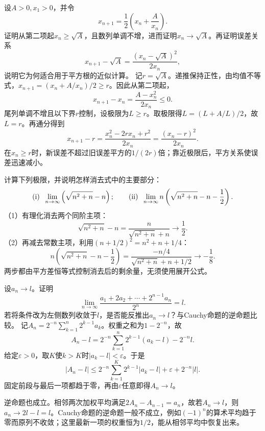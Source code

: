 设\(A>0,x_1>0\)，并令
\begin{equation*}
 x_{n+1}=\frac12\left(x_n+\frac A{x_n}\right).
\end{equation*}
证明从第二项起\(x_n\ge\sqrt A\)，且数列单调不增，进而证明\(x_n\to\sqrt A\)。再证明误差关系
\begin{equation*}
 x_{n+1}-\sqrt A=\frac{(x_n-\sqrt A)^2}{2x_n},
\end{equation*}
说明它为何适合用于平方根的近似计算。
\solutionanswer
记\(r=\sqrt A\)。递推保持正性，由均值不等式，\(x_{n+1}=(x_n+A/x_n)/2\ge r\)。因此从第二项起，
\[
x_{n+1}-x_n=\frac{A-x_n^2}{2x_n}\le0.
\]
尾列单调不增且以下界\(r\)控制，设极限为\(L\ge r\)。取极限得\(L=(L+A/L)/2\)，故\(L=r\)。再通分得到
\[
x_{n+1}-r=\frac{x_n^2-2rx_n+r^2}{2x_n}
=\frac{(x_n-r)^2}{2x_n}.
\]
在\(x_n\ge r\)时，新误差不超过旧误差平方的\(1/(2r)\)倍；靠近极限后，平方关系使误差迅速减小。


计算下列极限，并说明怎样消去式中的主要部分：
\begin{equation*}
 \exercisesubitem{1}\ \lim_{n\to\infty}\left(\sqrt{n^2+n}-n\right);
 \qquad
 \exercisesubitem{2}\ \lim_{n\to\infty}n\left(\sqrt{n^2+n}-n-\frac12\right).
\end{equation*}
\solutionanswer
（1）有理化消去两个同阶主项：
\[
\sqrt{n^2+n}-n=\frac n{\sqrt{n^2+n}+n}\to\frac12.
\]
（2）再减去常数主项，利用\((n+1/2)^2=n^2+n+1/4\)：
\[
n\left(\sqrt{n^2+n}-n-\frac12\right)
=\frac{-n/4}{\sqrt{n^2+n}+n+1/2}\to-\frac18.
\]
两步都由平方差恒等式控制消去后的剩余量，无须使用展开公式。


设\(a_n\to l\)。证明
\begin{equation*}
 \lim_{n\to\infty}\frac{a_1+2a_2+\cdots+2^{n-1}a_n}{2^n}=l.
\end{equation*}
若将条件改为左侧数列收敛于\(l\)，是否能反推出\(a_n\to l\)？与Cauchy命题的逆命题比较。
\solutionanswer
记\(A_n=2^{-n}\sum_{k=1}^n2^{k-1}a_k\)。权重之和为\(1-2^{-n}\)，故
\[
A_n-l=2^{-n}\sum_{k=1}^n2^{k-1}(a_k-l)-2^{-n}l.
\]
给定\(\varepsilon>0\)，取\(K\)使\(k>K\)时\(|a_k-l|<\varepsilon\)。于是
\[
|A_n-l|\le2^{-n}\sum_{k=1}^K2^{k-1}|a_k-l|+\varepsilon+2^{-n}|l|.
\]
固定前段与最后一项都趋于零，再由\(\varepsilon\)任意即得\(A_n\to l\)。

逆命题也成立。相邻两次加权平均满足\(2A_n-A_{n-1}=a_n\)，故若\(A_n\to l\)，则\(a_n\to2l-l=l\)。Cauchy命题的逆命题一般不成立，例如\((-1)^n\)的算术平均趋于零而原列不收敛；这里最新一项的权重恒为\(1/2\)，能从相邻平均中恢复出来。


